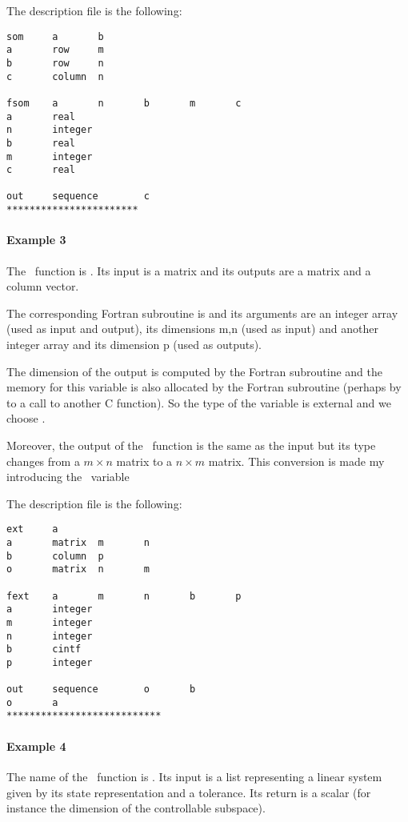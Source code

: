 The description file is the following:
\begin{verbatim}
som     a       b
a       row     m
b       row     n
c       column  n

fsom    a       n       b       m       c
a       real
n       integer
b       real
m       integer
c       real

out     sequence        c
***********************
\end{verbatim}

\paragraph{Example 3}
\label{ex3}

The \SCI\ function is . Its input is a matrix and its
outputs are a matrix and a column vector.

The corresponding Fortran subroutine is  and its arguments
are an integer array (used as input and output), its dimensions m,n (used as
input) and another integer array and its dimension p (used as outputs).

The dimension  of the output  is computed by the Fortran subroutine
and the memory for this variable is also allocated by the Fortran subroutine
(perhaps by to a call to another C function). So the type of the variable is
external and we choose .

Moreover, the output  of the \SCI\ function is the same as the input
but its type changes from a $m \times n$ matrix to a $n \times m$ matrix. This
conversion is made my introducing the \SCI\ variable 

The description file is the following:
\begin{verbatim}
ext     a
a       matrix  m       n
b       column  p
o       matrix  n       m

fext    a       m       n       b       p
a       integer
m       integer
n       integer
b       cintf
p       integer

out     sequence        o       b
o       a
***************************
\end{verbatim}

\paragraph{Example 4}
\label{ex4}

The name of the \SCI\ function is . Its input is a list representing
a linear system given by its state representation and a tolerance. Its return
is a scalar (for instance the dimension of the controllable subspace).

